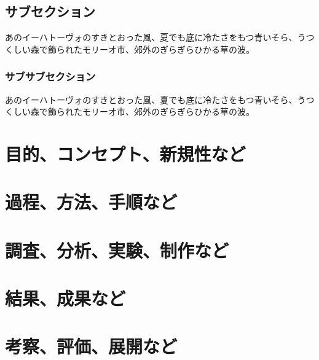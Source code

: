 \documentclass[uplatex,dvipdfmx]{ujarticle}
\begin{document}
\subsection{サブセクション}
あのイーハトーヴォのすきとおった風、夏でも底に冷たさをもつ青いそら、うつくしい森で飾られたモリーオ市、郊外のぎらぎらひかる草の波。

\subsubsection{サブサブセクション}
あのイーハトーヴォのすきとおった風、夏でも底に冷たさをもつ青いそら、うつくしい森で飾られたモリーオ市、郊外のぎらぎらひかる草の波。

\section{目的、コンセプト、新規性など}

\section{過程、方法、手順など}

\section{調査、分析、実験、制作など}

\section{結果、成果など}

\section{考察、評価、展開など}
\end{document}
